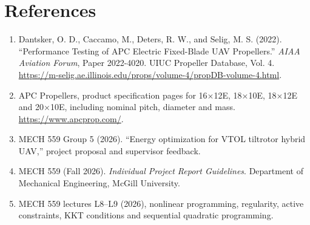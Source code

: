 \documentclass[12pt]{article}
\begin{document}
\section*{References}
\begin{enumerate}
\item Dantsker, O. D., Caccamo, M., Deters, R. W., and Selig, M. S. (2022). ``Performance Testing of APC Electric Fixed-Blade UAV Propellers.'' \emph{AIAA Aviation Forum}, Paper 2022-4020. UIUC Propeller Database, Vol. 4. \url{https://m-selig.ae.illinois.edu/props/volume-4/propDB-volume-4.html}.
\item APC Propellers, product specification pages for 16$\times$12E, 18$\times$10E, 18$\times$12E and 20$\times$10E, including nominal pitch, diameter and mass. \url{https://www.apcprop.com/}.
\item MECH 559 Group 5 (2026). ``Energy optimization for VTOL tiltrotor hybrid UAV,'' project proposal and supervisor feedback.
\item MECH 559 (Fall 2026). \emph{Individual Project Report Guidelines}. Department of Mechanical Engineering, McGill University.
\item MECH 559 lectures L8--L9 (2026), nonlinear programming, regularity, active constraints, KKT conditions and sequential quadratic programming.
\end{enumerate}
\end{document}
